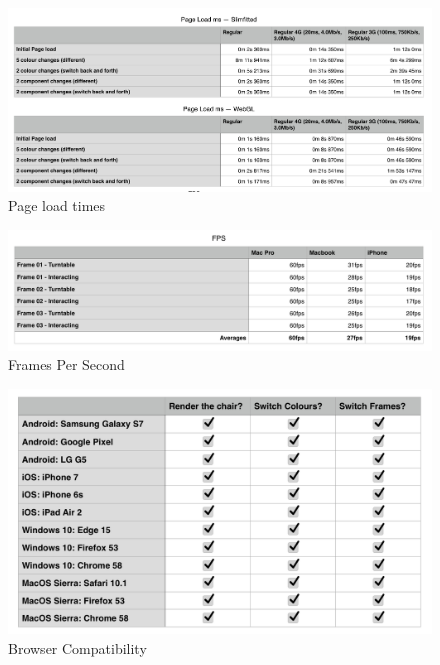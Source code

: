 \begin{figure}
\includegraphics[width=15cm]{images/pageLoadTime}
\caption{Page load times}
\label{attachment:pageLoadTime}
\end{figure}

\clearpage

\begin{figure}
\includegraphics[width=15cm]{images/fps}
\caption{Frames Per Second}
\label{attachment:fps}
\end{figure}

\begin{figure}
\includegraphics[width=15cm]{images/compatibility}
\caption{Browser Compatibility}
\label{attachment:compatibility}
\end{figure}





